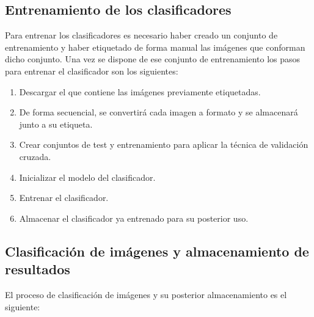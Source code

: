 
\subsection{Entrenamiento de los clasificadores}

Para entrenar los clasificadores es necesario haber creado un conjunto de entrenamiento y haber etiquetado de forma manual las imágenes que conforman dicho conjunto.
Una vez se dispone de ese conjunto de entrenamiento los pasos para entrenar el clasificador son los siguientes:

\begin{enumerate}
    \item Descargar el  que contiene las imágenes previamente etiquetadas.
    \item De forma secuencial, se convertirá cada imagen a formato  y se almacenará junto a su etiqueta.
    \item Crear conjuntos de test y entrenamiento para aplicar la técnica de validación cruzada.
    \item Inicializar el modelo del clasificador.
    \item Entrenar el clasificador.
    \item Almacenar el clasificador ya entrenado para su posterior uso.
\end{enumerate}

\subsection{Clasificación de imágenes y almacenamiento de resultados}

El proceso de clasificación de imágenes y su posterior almacenamiento es el siguiente:

